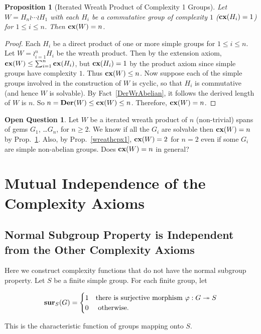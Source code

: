 \documentclass[a4paper,11pt]{amsart}
\newtheorem{proposition}[theorem]{Proposition}
\theoremstyle{definition}
\newtheorem{open}{Open Question}
\newcommand{\cx}{\mbox{\bf cx}}
\newcommand{\Der}{{\bf Der}}
\newcommand{\sur}{\twoheadrightarrow}
\newcommand{\1}{{\mathbf 1}}
\newcommand{\surS}{{\bf sur}}
\begin{document}
\begin{proposition}[Iterated Wreath Product of Complexity 1 Groups]\label{ItWrCpx1}
Let $W=H_n \wr \cdots \wr H_1$ with each 
 $H_i$ be a commutative group of complexity $1$ ($\cx(H_i)=1$) for $1\leq i \leq n$.
 Then $\cx(W)=n$.  
\end{proposition}

\begin{proof}
Each $H_i$ be a direct product of one or more  simple groups for $1\leq i \leq n$.
Let $W= \wr_{i=1}^n H_i$ be the wreath product.  Then by the extension axiom, 
$\cx(W) \leq \sum_{i=1}^n \cx(H_i)$, but $\cx(H_i)=1$ by the product axiom since simple groups have complexity $1$.
Thus $\cx(W) \leq n$.
Now suppose each of the simple groups involved in the construction of $W$ is cyclic, so that $H_i$ is commutative 
(and hence $W$ is solvable). By Fact~\ref{DerWrAbelian}, it follows
the derived length of $W$ is $n$. 
So $n = \Der(W) \leq \cx(W) \leq n$. Therefore, $\cx(W)=n$. 
\end{proof}

\begin{open}
Let $W$ be a iterated wreath product of $n$ (non-trivial) spans of gems $G_1$, \ldots $G_n$,  for $n \geq 2$.
We know if all the $G_i$ are solvable then $\cx(W)=n$ by Prop.~\ref{ItWrCpx1}. Also, by Prop.~\ref{wreathcpx1}, $\cx(W)=2$ for $n=2$ even if some $G_i$ are simple non-abelian groups.
Does  $\cx(W)=n$ in general? 
\end{open}


\section{Mutual Independence of the Complexity Axioms}
\subsection{Normal Subgroup Property is Independent from the Other Complexity Axioms}\label{normal}

Here we construct complexity functions that do not have the normal subgroup property. 
Let $S$ be a finite simple group.  For each finite group, let 
  
$$\surS_S(G)
   = \begin{cases}
      1 &  \mbox{there is surjective morphism }\varphi: G \sur S \\
      0      & \mbox{ otherwise.}
    \end{cases}$$
    
    
    This is the characteristic function of groups mapping onto $S$.  
    
\end{document}

